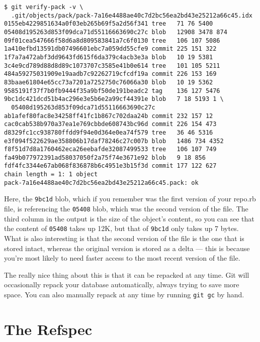 \documentclass[a4paper]{book}
\newcounter{tab}[chapter]
\begin{document}
\begin{shaded}\begin{verbatim}
$ git verify-pack -v \
  .git/objects/pack/pack-7a16e4488ae40c7d2bc56ea2bd43e25212a66c45.idx
0155eb4229851634a0f03eb265b69f5a2d56f341 tree   71 76 5400
05408d195263d853f09dca71d55116663690c27c blob   12908 3478 874
09f01cea547666f58d6a8d809583841a7c6f0130 tree   106 107 5086
1a410efbd13591db07496601ebc7a059dd55cfe9 commit 225 151 322
1f7a7a472abf3dd9643fd615f6da379c4acb3e3a blob   10 19 5381
3c4e9cd789d88d8d89c1073707c3585e41b0e614 tree   101 105 5211
484a59275031909e19aadb7c92262719cfcdf19a commit 226 153 169
83baae61804e65cc73a7201a7252750c76066a30 blob   10 19 5362
9585191f37f7b0fb9444f35a9bf50de191beadc2 tag    136 127 5476
9bc1dc421dcd51b4ac296e3e5b6e2a99cf44391e blob   7 18 5193 1 \
  05408d195263d853f09dca71d55116663690c27c
ab1afef80fac8e34258ff41fc1b867c702daa24b commit 232 157 12
cac0cab538b970a37ea1e769cbbde608743bc96d commit 226 154 473
d8329fc1cc938780ffdd9f94e0d364e0ea74f579 tree   36 46 5316
e3f094f522629ae358806b17daf78246c27c007b blob   1486 734 4352
f8f51d7d8a1760462eca26eebafde32087499533 tree   106 107 749
fa49b077972391ad58037050f2a75f74e3671e92 blob   9 18 856
fdf4fc3344e67ab068f836878b6c4951e3b15f3d commit 177 122 627
chain length = 1: 1 object
pack-7a16e4488ae40c7d2bc56ea2bd43e25212a66c45.pack: ok
\end{verbatim}\end{shaded}

Here, the \texttt{9bc1d} blob, which if you remember was the first version of your repo.rb file, is referencing the \texttt{05408} blob, which was the second version of the file. The third column in the output is the size of the object's content, so you can see that the content of \texttt{05408} takes up 12K, but that of \texttt{9bc1d} only takes up 7 bytes. What is also interesting is that the second version of the file is the one that is stored intact, whereas the original version is stored as a delta --- this is because you're most likely to need faster access to the most recent version of the file.

The really nice thing about this is that it can be repacked at any time. Git will occasionally repack your database automatically, always trying to save more space. You can also manually repack at any time by running \texttt{git gc} by hand.

\section{The Refspec}\label{the-refspec}
\end{document}
